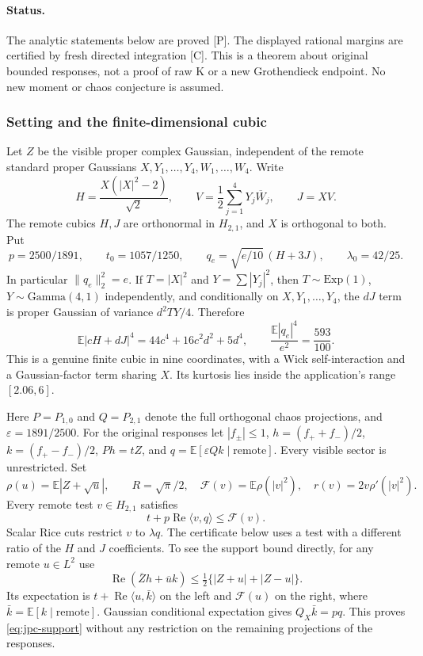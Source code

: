 \label{sec:coupled-projection-certificate}
\paragraph{Status.}
The analytic statements below are proved [P]. The displayed rational
margins are certified by fresh directed integration [C]. This is a
theorem about original bounded responses, not a proof of raw K or a new
Grothendieck endpoint. No new moment or chaos conjecture is assumed.

\subsubsection{Setting and the finite-dimensional cubic}
Let $Z$ be the visible proper complex Gaussian, independent of the
remote standard proper Gaussians $X,Y_1,\ldots,Y_4,W_1,\ldots,W_4$.
Write
\[
 H=\frac{X(|X|^2-2)}{\sqrt2},\qquad
 V=\frac12\sum_{j=1}^4Y_j\overline W_j,\qquad J=XV.
\]
The remote cubics $H,J$ are orthonormal in $H_{2,1}$, and $X$ is
orthogonal to both. Put
\[
 p=2500/1891,\qquad t_0=1057/1250,\qquad
 q_e=\sqrt{e/10}\,(H+3J),\qquad \lambda_0=42/25.
\]
In particular $\|q_e\|_2^2=e$.
If $T=|X|^2$ and $Y=\sum|Y_j|^2$, then $T\sim\mathrm{Exp}(1)$,
$Y\sim\mathrm{Gamma}(4,1)$ independently, and conditionally on
$X,Y_1,\ldots,Y_4$, the $dJ$ term is proper Gaussian of variance
$d^2TY/4$. Therefore
\[
 \mathbb E|cH+dJ|^4=44c^4+16c^2d^2+5d^4,
 \qquad \frac{\mathbb E|q_e|^4}{e^2}=\frac{593}{100}.
\]
This is a genuine finite cubic in nine coordinates, with a Wick
self-interaction and a Gaussian-factor term sharing $X$. Its kurtosis
lies inside the application's range $[2.06,6]$.

Here $P=P_{1,0}$ and $Q=P_{2,1}$ denote the full orthogonal chaos
projections, and $\varepsilon=1891/2500$. For the original responses let $|f_\pm|\le1$,
$h=(f_++f_-)/2$, $k=(f_+-f_-)/2$, $Ph=tZ$, and
$q=\mathbb E[\varepsilon Qk\mid\text{remote}]$.
Every visible sector is unrestricted. Set
\[
 \rho(u)=\mathbb E|Z+\sqrt u|,\qquad R=\sqrt\pi/2,
 \quad \mathcal F(v)=\mathbb E\rho(|v|^2),\quad
 r(v)=2v\rho'(|v|^2).
\]
Every remote test $v\in H_{2,1}$ satisfies
\begin{equation}\label{eq:jpc-support}
 t+p\operatorname{Re}\langle v,q\rangle\le\mathcal F(v).
\end{equation}
Scalar Rice cuts restrict $v$ to $\lambda q$. The certificate below
uses a test with a different ratio of the $H$ and $J$ coefficients.
To see the support bound directly, for any remote $u\in L^2$ use
\[
 \operatorname{Re}(\overline Z h+\overline u k)
 \le\tfrac12\{|Z+u|+|Z-u|\}.
\]
Its expectation is $t+\operatorname{Re}\langle u,\bar k\rangle$
on the left and $\mathcal F(u)$ on the right, where
$\bar k=\mathbb E[k\mid\text{remote}]$. Gaussian conditional expectation
gives $Q_X\bar k=pq$. This proves \eqref{eq:jpc-support} without
any restriction on the remaining projections of the responses.

